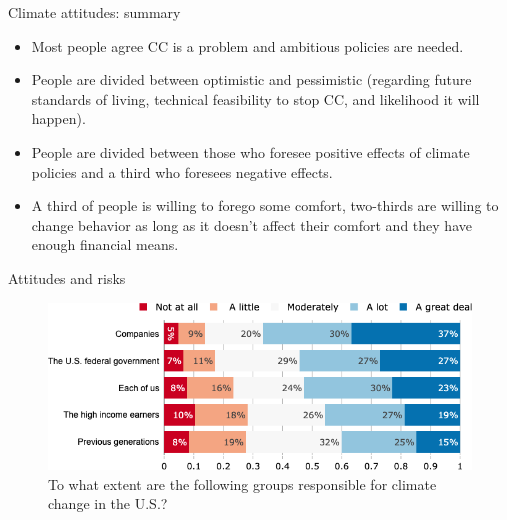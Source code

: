 \documentclass[aspectratio=169,9pt,dvipsnames]{beamer}
\begin{document}
\begin{frame}{Climate attitudes: summary}
    \begin{itemize}
    \item Most people agree CC is a problem and ambitious policies are needed.
    \item People are divided between optimistic and pessimistic (regarding future standards of living, technical feasibility to stop CC, and likelihood it will happen).
    \item People are divided between those who foresee positive effects of climate policies and a third who foresees negative effects.
    \item A third of people is willing to forego some comfort, two-thirds are willing to change behavior as long as it doesn't affect their comfort and they have enough financial means.
    \end{itemize}
\end{frame}

\begin{frame}{Attitudes and risks}%
\begin{figure}[h!]
\centering
\caption{To what extent are the following groups responsible for climate change in the U.S.?}
\includegraphics[width=.8\textwidth]{../figures/US/CC_responsible_US.png}
\end{figure}
\end{frame}
\end{document}

